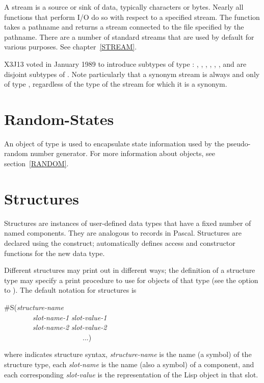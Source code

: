 A stream is a source or sink of data, typically characters or bytes.
Nearly all functions that perform I/O do so with respect to a specified
stream.  The function  takes a pathname and returns a stream
connected to the file specified by the pathname.
There are a number of standard streams that are used by default for
various purposes.  See chapter~\ref{STREAM}.

\begin{newer}
X3J13 voted in January 1989
to introduce subtypes of type :
, ,
, , , ,
and  are disjoint subtypes of .
Note particularly that a synonym stream is always and only of type
, regardless of the type of the stream for which it is a synonym.
\end{newer}

\section{Random-States}

An object of type  is used to encapsulate
state information used by the pseudo-random number generator.
For more information about  objects,
see section~\ref{RANDOM}.

\section{Structures}

Structures are instances of user-defined data types that have
a fixed number of named components.  They are analogous to
records in Pascal.
Structures are declared using the  construct;
 automatically defines access and constructor functions for
the new data type.

Different structures may print out in different ways;
the definition of a structure type may specify a print procedure
to use for objects of that type (see the
 option to ).
The default notation for structures is
\begin{lisp}
\#S(\emph{structure-name} \\
~~~~~~~~\emph{slot-name-1} \emph{slot-value-1} \\
~~~~~~~~\emph{slot-name-2} \emph{slot-value-2} \\
~~~~~~~~~~~~~~~~~~~~~~...)
\end{lisp}
where  indicates structure syntax, \emph{structure-name} is
the name (a symbol) of the structure type, each \emph{slot-name} is the name
(also a symbol) of a component, and each corresponding \emph{slot-value}
is the representation of the Lisp object in that slot.

